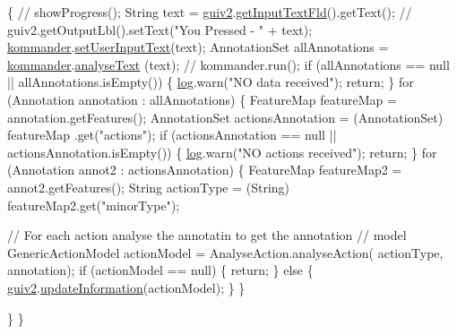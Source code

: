 \begin{DoxyCode}
                                          \{
        \textcolor{comment}{// showProgress();}
        String text = \hyperlink{classcom_1_1poly_1_1nlp_1_1filekommander_1_1_file_kommander_run_af105be529e7e9e9312aab57f6381b5ca}{guiv2}.\hyperlink{classcom_1_1poly_1_1nlp_1_1filekommander_1_1views_1_1_file_kommander_g_u_i_v2_aed87552f95c1a57c9175d75a6b8d4de5}{getInputTextFld}().getText();
        \textcolor{comment}{// guiv2.getOutputLbl().setText("You Pressed - " + text);}
        \hyperlink{classcom_1_1poly_1_1nlp_1_1filekommander_1_1_file_kommander_run_a2dffc1b40df78c82faf9567da220dae2}{kommander}.\hyperlink{classcom_1_1poly_1_1nlp_1_1filekommander_1_1_file_kommander_adf1a1371e27da05aa4f5125b6a3aa33c}{setUserInputText}(text);
        AnnotationSet allAnnotations = \hyperlink{classcom_1_1poly_1_1nlp_1_1filekommander_1_1_file_kommander_run_a2dffc1b40df78c82faf9567da220dae2}{kommander}.\hyperlink{classcom_1_1poly_1_1nlp_1_1filekommander_1_1_file_kommander_a1cf5ac4a3ebfd468ca38656a9d1bd0b9}{analyseText}
      (text);
        \textcolor{comment}{// kommander.run();}
        \textcolor{keywordflow}{if} (allAnnotations == null || allAnnotations.isEmpty()) \{
            \hyperlink{classcom_1_1poly_1_1nlp_1_1filekommander_1_1_file_kommander_run_ae7643c914a5fa93d155faafc32529519}{log}.warn(\textcolor{stringliteral}{"NO data received"});
            \textcolor{keywordflow}{return};
        \}
        \textcolor{keywordflow}{for} (Annotation annotation : allAnnotations) \{
            FeatureMap featureMap = annotation.getFeatures();
            AnnotationSet actionsAnnotation = (AnnotationSet) featureMap
                    .\textcolor{keyword}{get}(\textcolor{stringliteral}{"actions"});
            \textcolor{keywordflow}{if} (actionsAnnotation == null || actionsAnnotation.isEmpty()) \{
                \hyperlink{classcom_1_1poly_1_1nlp_1_1filekommander_1_1_file_kommander_run_ae7643c914a5fa93d155faafc32529519}{log}.warn(\textcolor{stringliteral}{"NO actions received"});
                \textcolor{keywordflow}{return};
            \}
            \textcolor{keywordflow}{for} (Annotation annot2 : actionsAnnotation) \{
                FeatureMap featureMap2 = annot2.getFeatures();
                String actionType = (String) featureMap2.get(\textcolor{stringliteral}{"minorType"});

                \textcolor{comment}{// For each action analyse the annotatin to get the annotation}
                \textcolor{comment}{// model}
                GenericActionModel actionModel = AnalyseAction.analyseAction(
                        actionType, annotation);
                \textcolor{keywordflow}{if} (actionModel == null) \{
                    \textcolor{keywordflow}{return};
                \} \textcolor{keywordflow}{else} \{
                    \hyperlink{classcom_1_1poly_1_1nlp_1_1filekommander_1_1_file_kommander_run_af105be529e7e9e9312aab57f6381b5ca}{guiv2}.\hyperlink{classcom_1_1poly_1_1nlp_1_1filekommander_1_1views_1_1_file_kommander_g_u_i_v2_ab9b5987afa8d8dca0e22c0010ae098b3}{updateInformation}(actionModel);
                \}
            \}

        \}
    \}
\end{DoxyCode}
